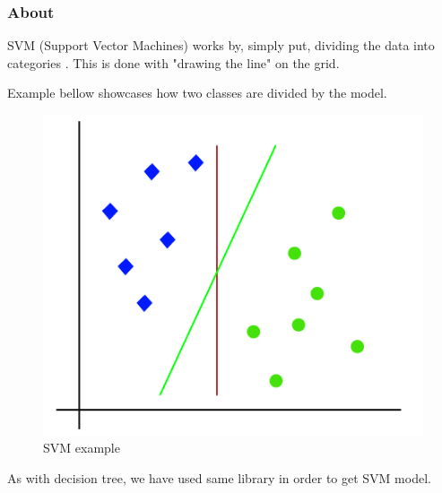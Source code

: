 \subsubsection{About}

SVM (Support Vector Machines) works by, simply put, dividing the data into categories \parencite{wang2005comparison}. This is done with "drawing the line" on the grid.

Example bellow showcases how two classes are divided by the model.
\begin{figure}[H]
    \includegraphics[scale=0.50]{img/Classification/SVM.png}
    \centering
    \caption{SVM example \parencite{web:Rocketloop}}
    \label{fig:SVM}
\end{figure}

As with decision tree, we have used same library in order to get SVM model.
